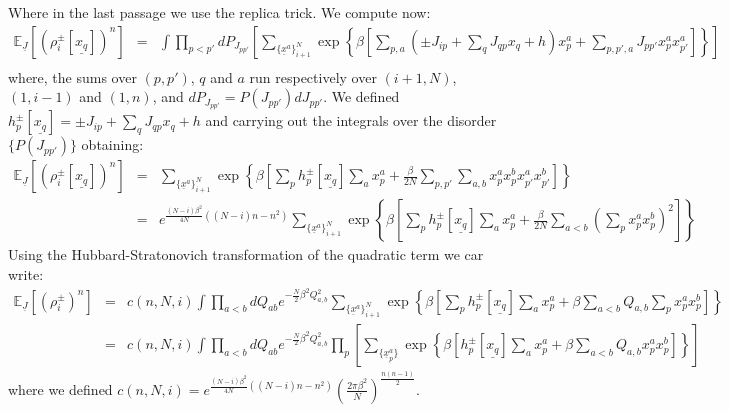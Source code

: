 \documentclass{article}
\begin{document}
Where in the last passage we use the replica trick. We compute now:
\begin{eqnarray}
\mathbb{E}_{\underline{J}}\left[(\rho_i^{\pm}[\underline{x_q}])^n \right] & = & 
\int \prod_{p<p'} dP_{J_{pp'}} \left[ 
\sum_{\{\underline{x}^{a}\}_{i+1}^N} \exp\left\{\beta \left[
\sum_{p,a}\left( \pm J_{ip} + \sum_{q} J_{qp} x_q + h \right) x_p^{a} + \sum_{p,p', a} J_{pp'} x_p^{a} x_{p'}^{a}
\right]  \right\} 
\right]\\
\end{eqnarray}
where, the sums over $(p,p')$, $q$ and $a$ run respectively over $(i+1,N)$, $(1,i-1)$ and $(1,n)$, and $dP_{J_{pp'}}=P(J_{pp'})dJ_{pp'}$. We defined $h_p^{\pm}[\underline{x_q}] =\pm J_{ip} + \sum_{q} J_{qp} x_q + h$ and carrying out the integrals over the disorder $\{P(J_{pp'})\}$ obtaining:
\begin{eqnarray}
\mathbb{E}_{\underline{J}}\left[(\rho_i^{\pm}[\underline{x_q}])^n \right] & = & 
\sum_{\{\underline{x}^{a}\}_{i+1}^N} 
\exp\left\{\beta \left[
\sum_{p} h_p^{\pm}[\underline{x_q}] \sum_{a} x_p^{a} +\frac{\beta}{2N} \sum_{p,p'} \sum_{a,b} x_p^{a} x_p^{b} x_{p'}^{a}x_{p'}^{b} \right]  \right\} \\
& = & e^{ \frac{(N-i) \beta^2}{4N}((N-i)n-n^2) } 
\sum_{\{\underline{x}^{a}\}_{i+1}^N} 
\exp\left\{\beta \left[
\sum_{p} h_p^{\pm}[\underline{x_q}] \sum_{a} x_p^{a} +\frac{\beta}{2N} \sum_{a<b} \left( \sum_{p}  x_p^{a} x_p^{b} \right)^2 \right]  \right\}
\end{eqnarray}
Using the Hubbard-Stratonovich transformation of the quadratic term we car write:
\begin{eqnarray}
\mathbb{E}_{\underline{J}}\left[(\rho_i^{\pm})^n \right] & = & 
c(n,N,i)
\int \prod_{a<b} dQ_{ab} e^{-\frac{N}{2}\beta^2Q_{a,b}^2}
\sum_{\{\underline{x}^{a}\}_{i+1}^N} 
\exp\left\{\beta \left[
\sum_{p} h_p^{\pm}[\underline{x_q}] \sum_{a} x_p^{a} +\beta \sum_{a<b} Q_{a,b} \sum_{p}  x_p^{a} x_p^{b} \right]  \right\} \\
& = & 
c(n,N,i)
\int \prod_{a<b} dQ_{ab} e^{-\frac{N}{2}\beta^2Q_{a,b}^2}
\prod_{p} \left[
\sum_{\{\underline{x}^{a}_p\}} 
\exp\left\{\beta \left[
h_p^{\pm}[\underline{x_q}] \sum_{a} x_p^{a} +\beta \sum_{a<b} Q_{a,b}  x_p^{a} x_p^{b} \right]  \right\}
\right] \label{eq:before_ansaltz}
\end{eqnarray}
where we defined $c(n,N,i) = e^{ \frac{(N-i) \beta^2}{4N}((N-i)n-n^2) } \left(\frac{2\pi \beta^2}{N}\right)^{\frac{n(n-1)}{2}}$. 
\end{document}
